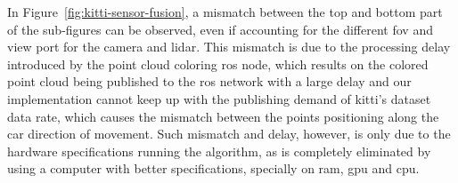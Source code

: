 In Figure~\ref{fig:kitti-sensor-fusion}, a mismatch between the top and bottom part of the sub-figures can be observed, even if accounting for the different \ac{fov} and view port for the camera and \ac{lidar}. This mismatch is due to the processing delay introduced by the point cloud coloring \ac{ros} node, which results on the colored point cloud being published to the \ac{ros} network with a large delay and our implementation cannot keep up with the publishing demand of \ac{kitti}'s dataset data rate, which causes the mismatch between the points positioning along the car direction of movement. Such mismatch and delay, however, is only due to the hardware  specifications running the algorithm, as is completely eliminated by using a computer with better specifications, specially on \ac{ram}, \ac{gpu} and \ac{cpu}.

